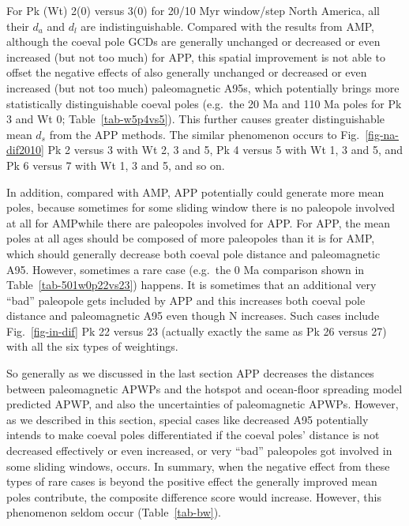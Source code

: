 For Pk (Wt) 2(0) versus 3(0) for 20/10 Myr window/step North America, all their
$d_a$ and $d_l$ are indistinguishable. Compared with the results from AMP,
although the coeval pole GCDs are generally unchanged or decreased or even
increased (but not too much) for APP, this spatial improvement is not able to
offset the negative effects of also generally unchanged or decreased or even
increased (but not too much) paleomagnetic A95s, which potentially brings more
statistically distinguishable coeval poles (e.g.\ the 20 Ma and 110 Ma poles for
Pk 3 and Wt 0; Table~\ref{tab-w5p4vs5}). This further causes greater
distinguishable mean $d_s$ from the APP methods. The similar phenomenon occurs
to Fig.~\ref{fig-na-dif2010} Pk 2 versus 3 with Wt 2, 3 and 5, Pk 4 versus 5
with Wt 1, 3 and 5, and Pk 6 versus 7 with Wt 1, 3 and 5, and so on.

In addition, compared with AMP, APP potentially could generate more mean poles,
because sometimes for some sliding window there is no paleopole involved at all
for AMP\@ while there are paleopoles involved for APP\@. For APP, the mean poles
at all ages should be composed of more paleopoles than it is for AMP, which
should generally decrease both coeval pole distance and paleomagnetic A95.
However, sometimes a rare case (e.g.\ the 0 Ma comparison shown in
Table~\ref{tab-501w0p22vs23}) happens. It is sometimes that an additional very
``bad'' paleopole gets included by APP and this increases both coeval pole
distance and paleomagnetic A95 even though N increases. Such cases include
Fig.~\ref{fig-in-dif} Pk 22 versus 23 (actually exactly the same as Pk 26 versus
27) with all the six types of weightings.

So generally as we discussed in the last section APP decreases the distances
between paleomagnetic APWPs and the hotspot and ocean-floor spreading model
predicted APWP, and also the uncertainties of paleomagnetic APWPs. However, as
we described in this section, special cases like decreased A95 potentially
intends to make coeval poles differentiated if the coeval poles' distance is
not decreased effectively or even increased, or very ``bad'' paleopoles got
involved in some sliding windows, occurs. In summary, when the negative effect
from these types of rare cases is beyond the positive effect the generally
improved mean poles contribute, the composite difference score would increase.
However, this phenomenon seldom occur (Table~\ref{tab-bw}).


